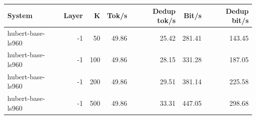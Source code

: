 \begin{tabular}{lrrrrrr}
\toprule
System & Layer & K & Tok/s & Dedup tok/s & Bit/s & Dedup bit/s \\
\midrule
hubert-base-ls960 & -1 & 50 & 49.86 & 25.42 & 281.41 & 143.45 \\
hubert-base-ls960 & -1 & 100 & 49.86 & 28.15 & 331.28 & 187.05 \\
hubert-base-ls960 & -1 & 200 & 49.86 & 29.51 & 381.14 & 225.58 \\
hubert-base-ls960 & -1 & 500 & 49.86 & 33.31 & 447.05 & 298.68 \\
\bottomrule
\end{tabular}
